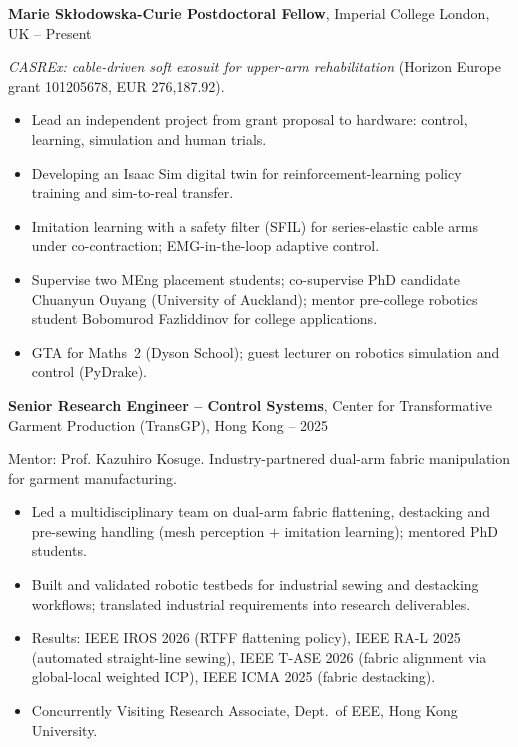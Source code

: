 \documentclass[10pt,a4paper]{article}
\newcommand{\job}[3]{\vspace{0.35em}\textbf{#1}, #2 \hfill {\small\sffamily #3}\par}
\begin{document}
\job{Marie Sk\l{}odowska-Curie Postdoctoral Fellow}{Imperial College London, UK}{2025 -- Present}
\textit{CASREx: cable-driven soft exosuit for upper-arm rehabilitation} (Horizon Europe grant 101205678, EUR 276,187.92).
\begin{itemize}
  \item Lead an independent project from grant proposal to hardware: control, learning, simulation and human trials.
  \item Developing an Isaac Sim digital twin for reinforcement-learning policy training and sim-to-real transfer.
  \item Imitation learning with a safety filter (SFIL) for series-elastic cable arms under co-contraction; EMG-in-the-loop adaptive control.
  \item Supervise two MEng placement students; co-supervise PhD candidate Chuanyun Ouyang (University of Auckland); mentor pre-college robotics student Bobomurod Fazliddinov for college applications.
  \item GTA for Maths~2 (Dyson School); guest lecturer on robotics simulation and control (PyDrake).
\end{itemize}

\job{Senior Research Engineer -- Control Systems}{Center for Transformative Garment Production (TransGP), Hong Kong}{2024 -- 2025}
Mentor: Prof. Kazuhiro Kosuge. Industry-partnered dual-arm fabric manipulation for garment manufacturing.
\begin{itemize}
  \item Led a multidisciplinary team on dual-arm fabric flattening, destacking and pre-sewing handling
        (mesh perception $+$ imitation learning); mentored PhD students.
  \item Built and validated robotic testbeds for industrial sewing and destacking workflows; translated
        industrial requirements into research deliverables.
  \item Results: IEEE IROS 2026 (RTFF flattening policy), IEEE RA-L 2025 (automated straight-line sewing),
        IEEE T-ASE 2026 (fabric alignment via global-local weighted ICP), IEEE ICMA 2025 (fabric destacking).
  \item Concurrently Visiting Research Associate, Dept.\ of EEE, Hong Kong University.
\end{itemize}
\end{document}
